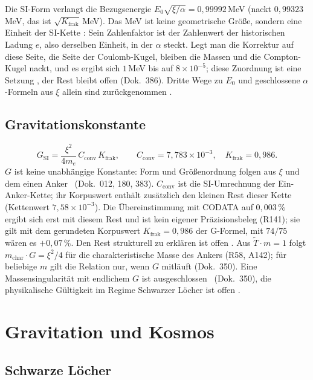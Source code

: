 Die SI-Form verlangt die Bezugsenergie
$E_0\sqrt{\xi/\alpha}=0{,}99992$\,MeV (nackt $0{,}99323$\,MeV, das ist $\sqrt{K_{\text{frak}}}$\,MeV).
Das MeV ist keine geometrische Größe, sondern eine Einheit der SI-Kette \QM: Sein Zahlenfaktor
ist der Zahlenwert der historischen Ladung $e$, also derselben Einheit, in der $\alpha$ steckt.
Legt man die Korrektur auf diese Seite, die Seite der Coulomb-Kugel, bleiben die Massen und die
Compton-Kugel nackt, und es ergibt sich $1$\,MeV bis auf $8\times10^{-5}$; diese Zuordnung ist eine
Setzung \SM, der Rest bleibt offen (Dok.~386).
Dritte Wege zu $E_0$ und geschlossene $\alpha$-Formeln aus $\xi$ allein sind zurückgenommen \XM.

\subsection{Gravitationskonstante}

\begin{equation}
  G_{\text{SI}}=\frac{\xi^2}{4m_e}\,C_{\text{conv}}\,K_{\text{frak}},\qquad
  C_{\text{conv}}=7{,}783\times10^{-3},\quad K_{\text{frak}}=0{,}986 .
\end{equation}
$G$ ist keine unabhängige Konstante: Form und Größenordnung folgen aus $\xi$ und dem einen Anker
\KM\ (Dok.~012, 180, 383). $C_{\text{conv}}$ ist die SI-Umrechnung der Ein-Anker-Kette; ihr
Korpuswert enthält zusätzlich den kleinen Rest dieser Kette (Kettenwert $7{,}58\times10^{-3}$).
Die Übereinstimmung mit CODATA auf $0{,}003\,\%$ ergibt sich erst mit diesem Rest und ist kein
eigener Präzisionsbeleg (R141); sie gilt mit dem gerundeten Korpuswert $K_{\text{frak}}=0{,}986$
der G-Formel, mit $74/75$ wären es $+0{,}07\,\%$. Den Rest strukturell zu erklären ist offen \SM.
Aus $\tilde T\cdot m=1$ folgt $m_{\text{char}}\cdot G=\xi^2/4$ für die charakteristische Masse des
Ankers (R58, A142); für beliebige $m$ gilt die Relation nur, wenn $G$ mitläuft (Dok.~350). Eine
Massensingularität mit endlichem $G$ ist
ausgeschlossen \BM\ (Dok.~350), die physikalische Gültigkeit im Regime Schwarzer Löcher ist
offen \SM.

\section{Gravitation und Kosmos}

\subsection{Schwarze Löcher}

